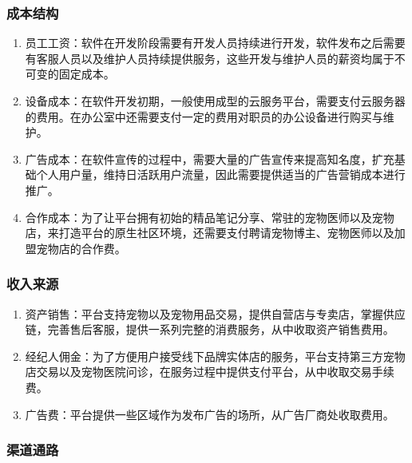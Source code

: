 \documentclass[a4paper]{ctexart}
\begin{document}
\subsubsection{成本结构}

\begin{enumerate}[label=\alph*.]
  \item 员工工资：软件在开发阶段需要有开发人员持续进行开发，软件发布之后需要有客服人员以及维护人员持续提供服务，这些开发与维护人员的薪资均属于不可变的固定成本。
  \item 设备成本：在软件开发初期，一般使用成型的云服务平台，需要支付云服务器的费用。在办公室中还需要支付一定的费用对职员的办公设备进行购买与维护。
  \item 广告成本：在软件宣传的过程中，需要大量的广告宣传来提高知名度，扩充基础个人用户量，维持日活跃用户流量，因此需要提供适当的广告营销成本进行推广。 
  \item 合作成本：为了让平台拥有初始的精品笔记分享、常驻的宠物医师以及宠物店，来打造平台的原生社区环境，还需要支付聘请宠物博主、宠物医师以及加盟宠物店的合作费。
\end{enumerate}

\subsubsection{收入来源}

\begin{enumerate}[label=\alph*.]
  \item 资产销售：平台支持宠物以及宠物用品交易，提供自营店与专卖店，掌握供应链，完善售后客服，提供一系列完整的消费服务，从中收取资产销售费用。
  \item 经纪人佣金：为了方便用户接受线下品牌实体店的服务，平台支持第三方宠物店交易以及宠物医院问诊，在服务过程中提供支付平台，从中收取交易手续费。
  \item 广告费：平台提供一些区域作为发布广告的场所，从广告厂商处收取费用。
\end{enumerate}

\subsubsection{渠道通路}
\end{document}
